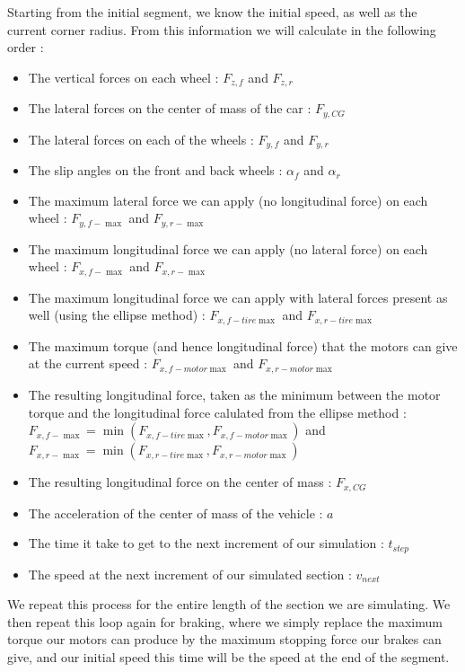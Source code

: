 \documentclass[a4paper, 11pt]{article}
\begin{document}
Starting from the initial segment, we know the initial speed, as well as the current corner radius. From this information we will calculate in the following order :
\begin{itemize}
	\item The vertical forces on each wheel : $F_{z,f}$ and $F_{z,r}$
	\item The lateral forces on the center of mass of the car : $F_{y,CG}$
	\item The lateral forces on each of the wheels : $F_{y,f}$ and $F_{y,r}$
	\item The slip angles on the front and back wheels : $\alpha_f$ and $\alpha_r$
	\item The maximum lateral force we can apply (no longitudinal force) on each wheel : $F_{y,f-\max}$ and $F_{y,r-\max}$
	\item The maximum longitudinal force we can apply (no lateral force) on each wheel : $F_{x,f-\max}$ and $F_{x,r-\max}$
	\item The maximum longitudinal force we can apply with lateral forces present as well (using the ellipse method) : $F_{x,f-tire \max}$ and $F_{x,r-tire \max}$
	\item The maximum torque (and hence longitudinal force) that the motors can give at the current speed : $F_{x,f-motor \max}$ and $F_{x,r-motor \max}$
	\item The resulting longitudinal force, taken as the minimum between the motor torque and the longitudinal force calulated from the ellipse method : $F_{x,f-\max} = \min\left(F_{x,f-tire \max}, F_{x,f-motor \max}\right)$ and $F_{x,r-\max} = \min\left(F_{x,r-tire \max}, F_{x,r-motor \max}\right)$
	\item The resulting longitudinal force on the center of mass : $F_{x,CG}$
	\item The acceleration of the center of mass of the vehicle : $a$
	\item The time it take to get to the next increment of our simulation : $t_{step}$
	\item The speed at the next increment of our simulated section : $v_{next}$
\end{itemize}

We repeat this process for the entire length of the section we are simulating. We then repeat this loop again for braking, where we simply replace the maximum torque our motors can produce by the maximum stopping force our brakes can give, and our initial speed this time will be the speed at the end of the segment.\\
\end{document}
